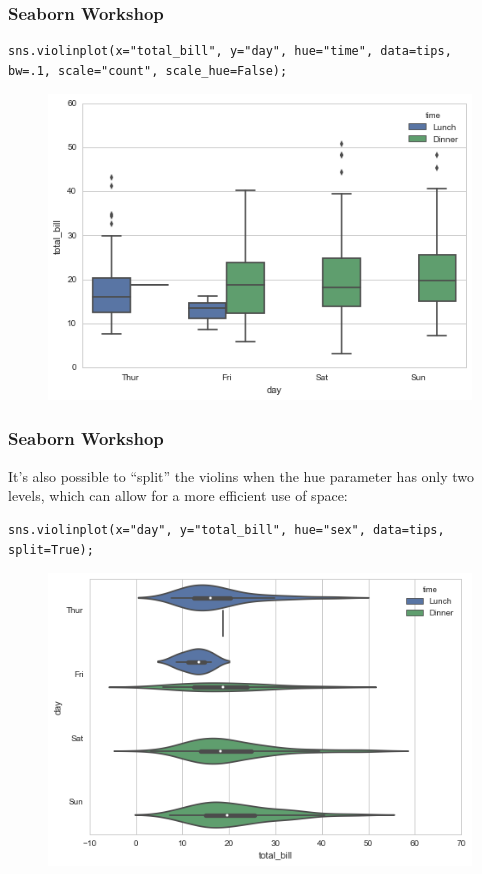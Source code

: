 \documentclass{beamer}
\begin{document}
\begin{frame}[fragile]
	\frametitle{Seaborn Workshop}
	\large
\begin{verbatim}
sns.violinplot(x="total_bill", y="day", hue="time", data=tips,
bw=.1, scale="count", scale_hue=False);
\end{verbatim}

\begin{figure}
\centering
\includegraphics[width=0.7\linewidth]{images/categorical_21_0}
\end{figure}

\end{frame}
\begin{frame}[fragile]
\frametitle{Seaborn Workshop}
\large It’s also possible to “split” the violins when the hue parameter has only two levels, which can allow for a more efficient use of space:
\begin{verbatim}
sns.violinplot(x="day", y="total_bill", hue="sex", data=tips, split=True);
\end{verbatim}
\begin{figure}
\centering
\includegraphics[width=0.7\linewidth]{images/categorical_23_0}
\caption{}
\label{fig:categorical_23_0}
\end{figure}

\end{frame}
\end{document}
